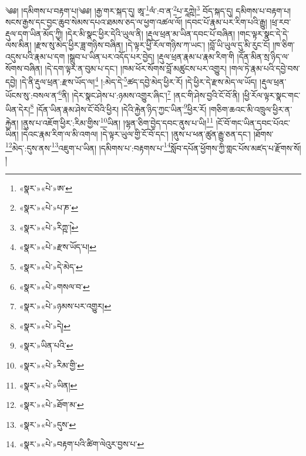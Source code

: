 ༄༅། །དམིགས་པ་བརྟག་པ།༄༅། །རྒྱ་གར་སྐད་དུ། ཨཱ་\footnote{«སྣར་»«པེ་»ཨ་}ལཾ་:བ་ན་\footnote{«སྣར་»«པེ་»པ་ཎ་}པ་རཱཀྵེ།\footnote{«སྣར་»«པེ་»རིཀྵ་ེ།} བོད་སྐད་དུ། དམིགས་པ་བརྟག་པ། སངས་རྒྱས་དང་བྱང་ཆུབ་སེམས་དཔའ་ཐམས་ཅད་ལ་ཕྱག་འཚལ་ལོ། །དབང་པོ་རྣམ་པར་རིག་པའི་རྒྱུ། །ཕྲ་རབ་རྡུལ་དག་ཡིན་མོད་ཀྱི། །དེར་མི་སྣང་ཕྱིར་དེའི་ཡུལ་ནི། །རྡུལ་ཕྲན་མ་ཡིན་དབང་པོ་བཞིན། །གང་ལྟར་སྣང་དེ་དེ་ལས་མིན། །རྫས་སུ་མེད་ཕྱིར་ཟླ་གཉིས་བཞིན། །དེ་ལྟར་ཕྱི་རོལ་གཉིས་ཀ་ཡང་། །བློ་ཡི་ཡུལ་དུ་མི་རུང་ངོ། །ཁ་ཅིག་འདུས་པའི་རྣམ་པ་དག །སྒྲུབ་པ་ཡིན་པར་འདོད་པར་བྱེད། །རྡུལ་ཕྲན་རྣམ་པ་རྣམ་རིག་གི །དོན་མིན་སྲ་ཉིད་ལ་སོགས་བཞིན། །དེ་དག་ལྟར་ན་བུམ་པ་དང་། །ཁམ་ཕོར་སོགས་བློ་མཚུངས་པར་འགྱུར། །གལ་ཏེ་རྣམ་པའི་དབྱེ་བས་དབྱེ། །དེ་ནི་རྡུལ་ཕྲན་:རྫས་ཡོད་ལ།\footnote{«སྣར་»«པེ་»རྫས་ཡོད་པ།} །:མེད་དེ་\footnote{«སྣར་»«པེ་»དེ་མེད་}ཚད་དབྱེ་མེད་ཕྱིར་རོ། །དེ་ཕྱིར་དེ་རྫས་མེད་ལ་ཡོད། །རྡུལ་ཕྲན་ཡོངས་སུ་:བསལ་ན་\footnote{«སྣར་»«པེ་»གསལ་བ་}ནི། །དེར་སྣང་ཤེས་པ་:ཉམས་འགྱུར་ཞིང་།\footnote{«སྣར་»«པེ་»ཉམས་པར་འགྱུར།} །ནང་གི་ཤེས་བྱའི་ངོ་བོ་ནི། །ཕྱི་རོལ་ལྟར་སྣང་གང་ཡིན་དེར།\footnote{«སྣར་»«པེ་»དེ།} །དོན་ཡིན་རྣམ་ཤེས་ངོ་བོའི་ཕྱིར། །དེའི་རྐྱེན་ཉིད་ཀྱང་ཡིན་\footnote{«སྣར་»ཡིན་པའི་}ཕྱིར་རོ། །གཅིག་ཆའང་མི་འཁྲུལ་ཕྱིར་ན་རྐྱེན། །ནུས་པ་འཇོག་ཕྱིར་:རིམ་གྱིས་\footnote{«སྣར་»«པེ་»རིམ་གྱི་}ཡིན། །ལྷན་ཅིག་བྱེད་དབང་ནུས་པ་ཡི།\footnote{«སྣར་»«པེ་»ཡིན།} །ངོ་བོ་གང་ཡིན་དབང་པོའང་ཡིན། །དེའང་རྣམ་རིག་ལ་མི་འགལ། །དེ་ལྟར་ཡུལ་གྱི་ངོ་བོ་དང་། །ནུས་པ་ཕན་ཚུན་རྒྱུ་ཅན་དང་། །ཐོགས་\footnote{«སྣར་»«པེ་»ཐོག་མ་}མེད་:དུས་ནས་\footnote{«སྣར་»«པེ་»དུས་}འཇུག་པ་ཡིན། །དམིགས་པ་:བརྟགས་པ་\footnote{«སྣར་»«པེ་»བརྟག་པའི་ཚིག་ལེའུར་བྱས་པ་}སློབ་དཔོན་ཕྱོགས་ཀྱི་གླང་པོས་མཛད་པ་རྫོགས་སོ། ། 